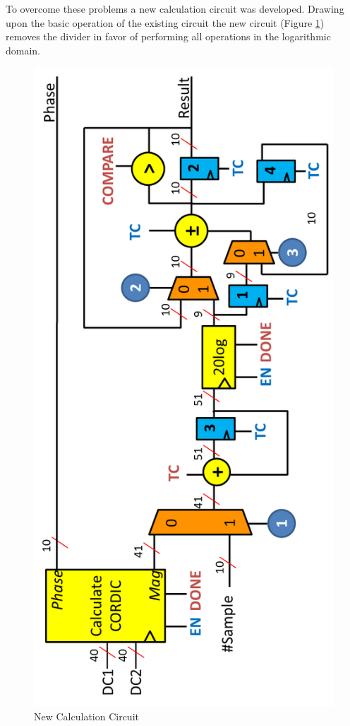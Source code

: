 \documentclass[12pt]{report}
\begin{document}
To overcome these problems a new calculation circuit was developed.  Drawing upon the basic operation of the existing circuit the new circuit (Figure \ref{fig:newcalc}) removes the divider in favor of performing all operations in the logarithmic domain.
\begin{figure}
	\begin{center}
		\includegraphics[scale=.8]{images/new-calculation}
	\end{center}
	\caption{New Calculation Circuit}
	\label{fig:newcalc}
\end{figure}
\end{document}
